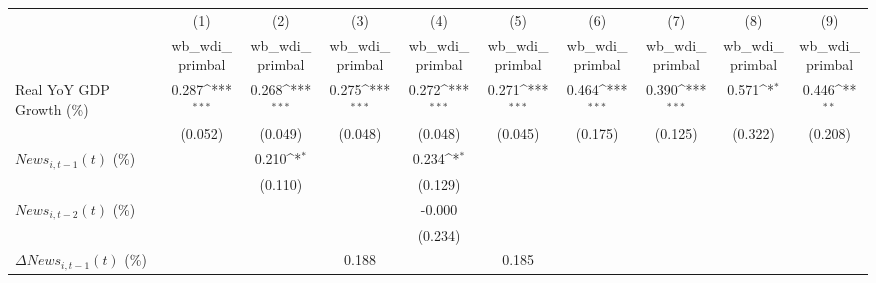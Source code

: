 {
\def\sym#1{\ifmmode^{#1}\else\(^{#1}\)\fi}
\begin{tabular}{l*{9}{c}}
\toprule
                    &\multicolumn{1}{c}{(1)}&\multicolumn{1}{c}{(2)}&\multicolumn{1}{c}{(3)}&\multicolumn{1}{c}{(4)}&\multicolumn{1}{c}{(5)}&\multicolumn{1}{c}{(6)}&\multicolumn{1}{c}{(7)}&\multicolumn{1}{c}{(8)}&\multicolumn{1}{c}{(9)}\\
                    &\multicolumn{1}{c}{wb_wdi_primbal}&\multicolumn{1}{c}{wb_wdi_primbal}&\multicolumn{1}{c}{wb_wdi_primbal}&\multicolumn{1}{c}{wb_wdi_primbal}&\multicolumn{1}{c}{wb_wdi_primbal}&\multicolumn{1}{c}{wb_wdi_primbal}&\multicolumn{1}{c}{wb_wdi_primbal}&\multicolumn{1}{c}{wb_wdi_primbal}&\multicolumn{1}{c}{wb_wdi_primbal}\\
\midrule
Real YoY GDP Growth (\%)&       0.287\sym{***}&       0.268\sym{***}&       0.275\sym{***}&       0.272\sym{***}&       0.271\sym{***}&       0.464\sym{***}&       0.390\sym{***}&       0.571\sym{*}  &       0.446\sym{**} \\
                    &     (0.052)         &     (0.049)         &     (0.048)         &     (0.048)         &     (0.045)         &     (0.175)         &     (0.125)         &     (0.322)         &     (0.208)         \\
\addlinespace
$ News_{i,t-1}(t)$ (\%)&                     &       0.210\sym{*}  &                     &       0.234\sym{*}  &                     &                     &                     &                     &                     \\
                    &                     &     (0.110)         &                     &     (0.129)         &                     &                     &                     &                     &                     \\
\addlinespace
$ News_{i,t-2}(t)$ (\%)&                     &                     &                     &      -0.000         &                     &                     &                     &                     &                     \\
                    &                     &                     &                     &     (0.234)         &                     &                     &                     &                     &                     \\
\addlinespace
$ \Delta News_{i,t-1}(t)$ (\%)&                     &                     &       0.188         &                     &       0.185         &                     &                     &                     &                     \\

\end{tabular}}
